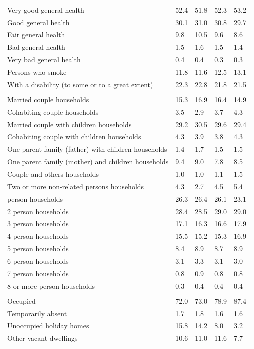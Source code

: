 \documentclass{article}
\begin{document}
\begin{table}[h]
\begin{tabular}{KTTTT}
    \hline
Very good general health & 52.4& 51.8&52.3& 53.2\\
Good general health & 30.1& 31.0& 30.8& 29.7\\
Fair general health &  9.8& 10.5& 9.6&  8.6\\
Bad general health & 1.5& 1.6&1.5& 1.4\\
Very bad general health & 0.4& 0.4&0.3& 0.3\\
    \hline
Persons who smoke & 11.8& 11.6&12.5& 13.1\\
    \hline
With a disability (to some or to a great extent) & 22.3& 22.8&21.8& 21.5\\
\hline
    \\ 
    \hline
Married couple households & 15.3& 16.9& 16.4& 14.9\\
Cohabiting couple households & 3.5& 2.9& 3.7& 4.3\\
Married couple with children households & 29.2& 30.5& 29.6& 29.4\\
Cohabiting couple with children households & 4.3& 3.9& 3.8& 4.3\\
One parent family (father) with  children households & 1.4& 1.7& 1.5& 1.5\\
One parent family (mother) and children households & 9.4& 9.0& 7.8& 8.5\\
Couple and others households  & 1.0& 1.0& 1.1& 1.5\\
Two or more non-related persons households & 4.3& 2.7& 4.5& 5.4\\
     person households & 26.3& 26.4& 26.1& 23.1\\
2 person households & 28.4& 28.5& 29.0& 29.0\\
3 person households & 17.1& 16.3& 16.6& 17.9\\
4 person households & 15.5& 15.2& 15.3& 16.9\\
5 person households & 8.4& 8.9& 8.7& 8.9\\
6 person households & 3.1& 3.3& 3.1& 3.0\\
7 person households & 0.8& 0.9& 0.8& 0.8\\
8 or more person households & 0.3& 0.4& 0.4& 0.4\\
\hline
    \\ 
    \hline
Occupied & 72.0& 73.0& 78.9& 87.4\\
Temporarily absent & 1.7& 1.8& 1.6& 1.6\\
Unoccupied holiday homes & 15.8& 14.2&  8.0&  3.2\\
Other vacant dwellings & 10.6& 11.0& 11.6&  7.7\\
\hline
\end{tabular}
\end{table}
\end{document}
